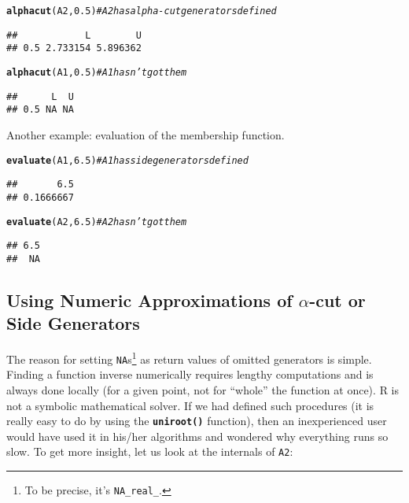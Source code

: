 \documentclass[11pt]{article}\usepackage[]{graphicx}\usepackage[]{color}
\makeatletter
\newcommand{\hlnum}[1]{\textcolor[rgb]{0.686,0.059,0.569}{#1}}%
\newcommand{\hlcom}[1]{\textcolor[rgb]{0.678,0.584,0.686}{\textit{#1}}}%
\newcommand{\hlstd}[1]{\textcolor[rgb]{0.345,0.345,0.345}{#1}}%
\newcommand{\hlkwd}[1]{\textcolor[rgb]{0.737,0.353,0.396}{\textbf{#1}}}%
\newenvironment{kframe}{%
 \def\at@end@of@kframe{}%
 \ifinner\ifhmode%
  \def\at@end@of@kframe{\end{minipage}}%
  \begin{minipage}{\columnwidth}%
 \fi\fi%
 \def\FrameCommand##1{\hskip\@totalleftmargin \hskip-\fboxsep
 \colorbox{shadecolor}{##1}\hskip-\fboxsep
     \hskip-\linewidth \hskip-\@totalleftmargin \hskip\columnwidth}%
 \MakeFramed {\advance\hsize-\width
   \@totalleftmargin\z@ \linewidth\hsize
   \@setminipage}}%
 {\par\unskip\endMakeFramed%
 \at@end@of@kframe}
\newenvironment{knitrout}{}{} %
\newcommand{\lang}[1]{\textsf{#1}\xspace}
\newcommand{\R}{\lang{R}}
\newcommand{\func}[1]{\texttt{\hlkwd{#1}}}
\makeatother
\begin{document}
\begin{knitrout}\small
{}\color{fgcolor}\begin{kframe}
\begin{alltt}
\hlkwd{alphacut}\hlstd{(A2,} \hlnum{0.5}\hlstd{)} \hlcom{# A2 has alpha-cut generators defined}
\end{alltt}
\begin{verbatim}
##            L        U
## 0.5 2.733154 5.896362
\end{verbatim}
\begin{alltt}
\hlkwd{alphacut}\hlstd{(A1,} \hlnum{0.5}\hlstd{)} \hlcom{# A1 hasn't got them}
\end{alltt}
\begin{verbatim}
##      L  U
## 0.5 NA NA
\end{verbatim}
\end{kframe}
\end{knitrout}

\noindent
Another example: evaluation of the membership function.

\begin{knitrout}\small
{}\color{fgcolor}\begin{kframe}
\begin{alltt}
\hlkwd{evaluate}\hlstd{(A1,} \hlnum{6.5}\hlstd{)} \hlcom{# A1 has side generators defined}
\end{alltt}
\begin{verbatim}
##       6.5 
## 0.1666667
\end{verbatim}
\begin{alltt}
\hlkwd{evaluate}\hlstd{(A2,} \hlnum{6.5}\hlstd{)} \hlcom{# A2 hasn't got them}
\end{alltt}
\begin{verbatim}
## 6.5 
##  NA
\end{verbatim}
\end{kframe}
\end{knitrout}

\subsection{Using Numeric Approximations of $\alpha$-cut or Side Generators}

The reason for setting
\texttt{NA}s\footnote{To be precise, it's \texttt{NA\_real\_}.}
as return values of omitted generators
is simple. Finding a function inverse numerically
requires lengthy computations and is always done locally
(for a given point, not for ``whole'' the function at once).
\R is not a symbolic mathematical solver.
If we had defined such procedures (it is really easy to do
by using the \func{uniroot()} function), then an inexperienced user
would have used it in his/her algorithms and wondered why everything
runs so slow. To get more insight, let us look at the internals of \texttt{A2}:
\end{document}
